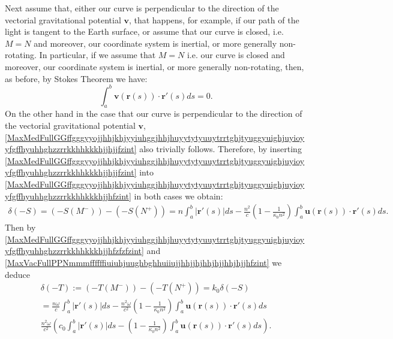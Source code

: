 \documentclass{article}
\theoremstyle{definition}
\theoremstyle{remark}
\renewcommand{\vec}[1]{\mathbf{#1}}
\newcommand{\er}{\eqref}
\newcommand{\er}{\eqref}
\begin{document}
Next assume that, either our curve is perpendicular to the direction
of the vectorial gravitational potential $\vec v$, that happens, for
example, if our path of the light is tangent to the Earth surface,
or assume that our curve is closed, i.e. $M=N$ and moreover, our
coordinate system is inertial, or more generally non-rotating. In
particular, if we assume that $M=N$ i.e. our curve is closed and
moreover, our coordinate system is inertial, or more generally
non-rotating, then, as before, by Stokes Theorem we have:
\begin{equation}\label{MaxMedFullGGffgggyyojjhhjkhjyyiuhggjhhjhuyytytyuuytrrtghjtyuggyuighjuyioyyfgffhyuhhghzzrrkkhhkkkhjjhjjfzint}
\int_a^b\vec v\left(\vec r(s)\right)\cdot\vec r'(s)ds=0.
\end{equation}
On the other hand in the case that our curve is perpendicular to the
direction of the vectorial gravitational potential $\vec v$,
\er{MaxMedFullGGffgggyyojjhhjkhjyyiuhggjhhjhuyytytyuuytrrtghjtyuggyuighjuyioyyfgffhyuhhghzzrrkkhhkkkhjjhjjfzint}
also trivially follows. Therefore, by inserting
\er{MaxMedFullGGffgggyyojjhhjkhjyyiuhggjhhjhuyytytyuuytrrtghjtyuggyuighjuyioyyfgffhyuhhghzzrrkkhhkkkhjjhjjfzint}
into
\er{MaxMedFullGGffgggyyojjhhjkhjyyiuhggjhhjhuyytytyuuytrrtghjtyuggyuighjuyioyyfgffhyuhhghzzrrkkhhkkkhjjhfzint}
in both cases we obtain:
\begin{multline}\label{MaxMedFullGGffgggyyojjhhjkhjyyiuhggjhhjhuyytytyuuytrrtghjtyuggyuighjuyioyyfgffhyuhhghzzrrkkhhkkkhjjhfzfzfzint}
\delta(-S)=\left(-S(M^-)\right)- \left(-S(N^+)\right)= n\int_a^b
\left|\vec
r'(s)\right|ds-\frac{n^2}{c}\left(1-\frac{1}{\kappa_0n^2}\right)\int_a^b\vec
u\left(\vec r(s)\right)\cdot\vec r'(s)ds.
\end{multline}
Then by
\er{MaxMedFullGGffgggyyojjhhjkhjyyiuhggjhhjhuyytytyuuytrrtghjtyuggyuighjuyioyyfgffhyuhhghzzrrkkhhkkkhjjhfzfzfzint}
and
\er{MaxVacFullPPNmmmffffffiuiuhjuughbghhuiiujjhhjjhjhhjhjjhhjhjjhfzint}
we deduce
\begin{multline}\label{MaxMedFullGGffgggyyojjhhjkhjyyiuhggjhhjhuyytytyuuytrrtghjtyuggyuighjuyioyyfgffhyuhhghzzrrkkhhkkkhjjhfzfzfzfzffzint}
\delta(-T):=\left(-T(M^-)\right)-
\left(-T(N^+)\right)=k_0\delta(-S)\\= \frac{n\omega}{c}\int_a^b
\left|\vec
r'(s)\right|ds-\frac{n^2\omega}{c^2}\left(1-\frac{1}{\kappa_0n^2}\right)\int_a^b\vec
u\left(\vec r(s)\right)\cdot\vec r'(s)ds\\
\frac{n^2\omega}{c^2}\left(c_0\int_a^b \left|\vec
r'(s)\right|ds-\left(1-\frac{1}{\kappa_0n^2}\right)\int_a^b\vec
u\left(\vec r(s)\right)\cdot\vec r'(s)ds\right).
\end{multline}
\end{document}
